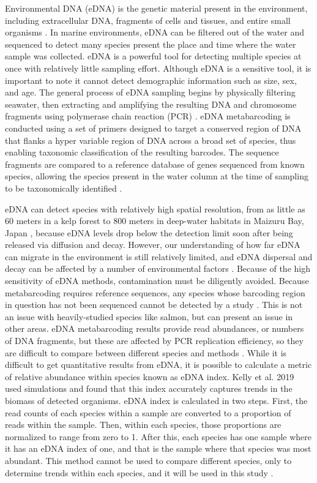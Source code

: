 \documentclass[12pt,twoside]{reedthesis}
\begin{document}
{Environmental DNA (eDNA) is the genetic material present in the environment, including extracellular DNA, fragments of cells and tissues, and entire small organisms \autocite{Taberlet2018}. In marine environments, eDNA can be filtered out of the water and sequenced to detect many species present the place and time where the water sample was collected. eDNA is a powerful tool for detecting multiple species at once with relatively little sampling effort. Although eDNA is a sensitive tool, it is important to note it cannot detect demographic information such as size, sex, and age. The general process of eDNA sampling begins by physically filtering seawater, then extracting and amplifying the resulting DNA and chromosome fragments using polymerase chain reaction (PCR) \autocite{Power2023}. eDNA metabarcoding is conducted using a set of  primers designed to target a conserved region of DNA that flanks a hyper variable region of DNA across a broad set of species, thus enabling taxonomic classification of the resulting barcodes. The sequence fragments are compared to a reference database of genes sequenced from known species, allowing the species present in the water column at the time of sampling to be taxonomically identified \autocite{Miya2022}.

eDNA can detect species with relatively high spatial resolution, from as little as 60 meters in a kelp forest \autocite{Port2016} to 800 meters in deep-water habitats in Maizuru Bay, Japan \autocite{Yamamoto2017}, because eDNA levels drop below the detection limit soon after being released via diffusion and decay. However, our understanding of how far eDNA can migrate in the environment is still relatively limited, and eDNA dispersal and decay can be affected by a number of environmental factors \autocite{Cristescu2018}. Because of the high sensitivity of eDNA methods, contamination must be diligently avoided. Because metabarcoding requires reference sequences, any species whose barcoding region in question has not been sequenced cannot be detected by a study \autocite{Miya2022}. This is not an issue with heavily-studied species like salmon, but can present an issue in other areas. eDNA metabarcoding results provide read abundances, or numbers of DNA fragments, but these are affected by PCR replication efficiency, so they are difficult to compare between different species and methods \autocite{Miya2022}. While it is difficult to get quantitative results from eDNA, it is possible to calculate a metric of relative abundance within species known as eDNA index. Kelly et al. 2019 used simulations and found that this index accurately captures trends in the biomass of detected organisms. eDNA index is calculated in two steps. First, the read counts of each species within a sample are converted to a proportion of reads within the sample. Then, within each species, those proportions are normalized to range from zero to 1. After this, each species has one sample where it has an eDNA index of one, and that is the sample where that species was most abundant. This method cannot be used to compare different species, only to determine trends within each species, and it will be used in this study \autocite{Kelly2019}.

}
\end{document}
